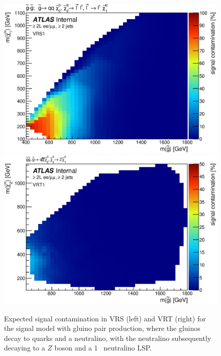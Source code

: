 \begin{figure}[ht]
\centering
\includegraphics[width=.48\textwidth]{figures/signalacceptcontam/cont_SM_GG_N2_1_VRS1.eps}
\includegraphics[width=.48\textwidth]{figures/signalacceptcontam/cont_SM_GG_N2_1_VRT1.eps}
\caption{
Expected signal contamination in VRS (left) and VRT (right) for the signal model with gluino pair production, where the gluinos decay to quarks and a neutralino, 
with the neutralino subsequently decaying to a $Z$ boson and a 1 \gev~neutralino LSP.}
\label{fig:sig_contam_VR}
\end{figure}

